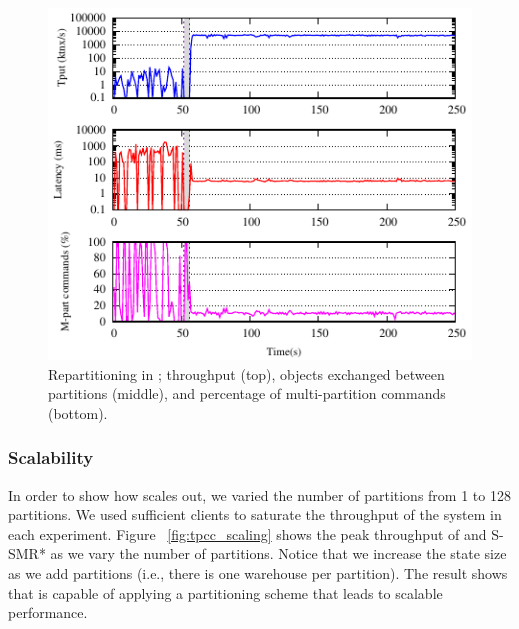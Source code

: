\begin{figure}[ht!]
  \centering
    \includegraphics[width=0.9\columnwidth]{figures/experiments/tpcc-detail-dynastar}
  \caption{Repartitioning in \dynastar; throughput (top), objects exchanged between partitions (middle), 
  and percentage of multi-partition commands (bottom).}
  \label{fig:tpcc_repartitioning}
\end{figure}

\subsubsection{Scalability}
In order to show how \dynastar scales out, we varied the number of partitions from 1 to 128 partitions. 
We used sufficient clients to  saturate the throughput of the system in each experiment. 
Figure ~\ref{fig:tpcc_scaling} shows the peak throughput of \dynastar and S-SMR* as we vary the 
number of partitions. 
Notice that we increase the state size as we add partitions (i.e., there is one warehouse per partition).
The result shows that \dynastar is capable of applying
a partitioning scheme that leads to scalable performance.

